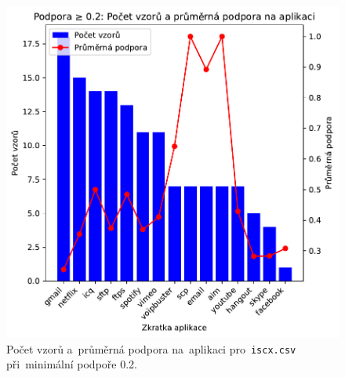 \begin{figure}[H]
\begin{minipage}[t]{0.49\textwidth}
        \includegraphics[width=\linewidth]{obrazky-figures/exps/patterns_support_0.2_iscx.pdf}
        \caption{Počet vzorů a~průměrná podpora na~aplikaci pro~\texttt{iscx.csv} při~minimální podpoře 0.2.}
        \label{fig:appendix-}
    \end{minipage}
\end{figure}

